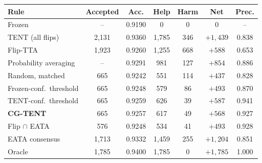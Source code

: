 \begin{tabular}{@{}lcccccc@{}}
\toprule
Rule & Accepted & Acc. & Help & Harm & Net & Prec. \\
\midrule
Frozen & -- & 0.9190 & 0 & 0 & 0 & -- \\
TENT (all flips) & 2,131 & 0.9360 & 1,785 & 346 & $+1{,}439$ & 0.838 \\
Flip-TTA & 1,923 & 0.9260 & 1,255 & 668 & $+588$ & 0.653 \\
Probability averaging & -- & 0.9291 & 981 & 127 & $+854$ & 0.886 \\
\midrule
Random, matched & 665 & 0.9242 & 551 & 114 & $+437$ & 0.828 \\
Frozen-conf.\ threshold & 665 & 0.9248 & 579 & 86 & $+493$ & 0.870 \\
TENT-conf.\ threshold & 665 & 0.9259 & 626 & 39 & $+587$ & 0.941 \\
\textbf{CG-TENT} & 665 & 0.9257 & 617 & 49 & $+568$ & 0.927 \\
Flip $\cap$ EATA & 576 & 0.9248 & 534 & 41 & $+493$ & 0.928 \\
EATA consensus & 1,713 & 0.9332 & 1,459 & 255 & $+1{,}204$ & 0.851 \\
Oracle & 1,785 & 0.9400 & 1,785 & 0 & $+1{,}785$ & 1.000 \\
\bottomrule
\end{tabular}
